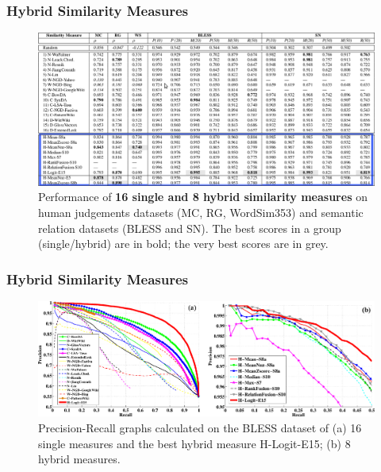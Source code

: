 \documentclass{beamer}
\begin{document}


%		
	

\begin{frame}
\frametitle{Hybrid Similarity Measures}

	\begin{figure}
	\centering
		\includegraphics[width=1.0\textwidth]{figures/table-hybrid-hybrid}
		
		\caption{ Performance of \textbf{16 single and 8 hybrid similarity measures} on human judgements datasets (MC, RG,
WordSim353) and semantic relation datasets (BLESS and SN). The best scores in a group (single/hybrid) are in
bold; the very best scores are in grey. }
\end{figure}
	
	
\end{frame}

\begin{frame}
 \frametitle{Hybrid Similarity Measures}
	\begin{figure}
	\centering
		\includegraphics[width=1.0\textwidth]{figures/pr}
		\caption{Precision-Recall graphs calculated on the BLESS dataset of (a) 16 single measures and the best hybrid
measure H-Logit-E15; (b) 8 hybrid measures.}
\end{figure}
	
\end{frame}
\end{document}
